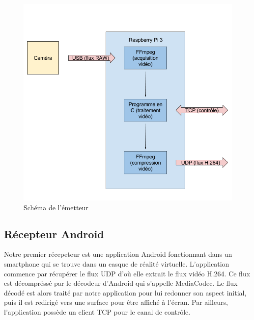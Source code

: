 \documentclass[11pt,a4paper]{article}
\begin{document}
\bigbreak
\begin{figure}[H]
\begin{center}
\includegraphics[scale=0.35]{images/schema_emetteur.png}
\end{center}
\caption{Schéma de l'émetteur}
\label{}
\end{figure}
\bigbreak

\subsection{Récepteur Android}
Notre premier récepeteur est une application Android fonctionnant dans un smartphone qui se trouve dans un casque de réalité virtuelle.
L'application commence par récupérer le flux UDP d'où elle extrait le flux vidéo H.264.
Ce flux est décompréssé par le décodeur d'Android qui s'appelle MediaCodec.
Le flux décodé est alors traité par notre application pour lui redonner son aspect initial, puis il est redirigé vers une surface pour être affiché à l'écran.
Par ailleurs, l'application possède un client TCP pour le canal de contrôle.
\end{document}
